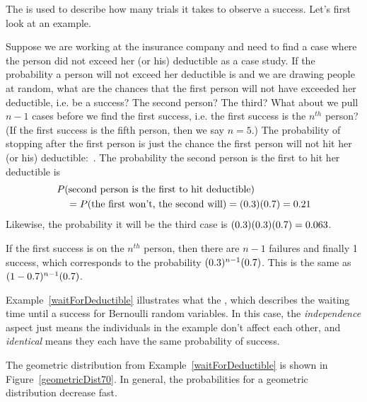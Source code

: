 The 
is used to describe how
many trials it takes to observe a success.
Let's first look at an example.

\begin{examplewrap}
\begin{nexample}{Suppose we are working at the insurance
    company and need to find a case where the person did
    not exceed her (or his) deductible as a case study.
    If the probability a person will not exceed her
    deductible is \insureSprob{} and we are drawing people
    at random, what are the chances that the first person
    will not have exceeded her deductible, i.e. be a success?
    The second person?
    The third?
    What about we pull $n - 1$ cases before we find
    the first success, i.e. the first success is the
    $n^{th}$ person?
    (If the first success is the fifth person, then we say $n=5$.)}
  \label{waitForDeductible}%
  The probability of stopping after the first person is just
  the chance the first person will not hit her (or his)
  deductible:~\insureSprob{}.
  The probability the second person is the first to hit
  her deductible is
  \begin{align*}
  &P(\text{second person is the first to hit deductible}) \\
  &\quad
    = P(\text{the first won't, the second will})
    = (0.3{})(0.7{})
    = 0.21{}
  \end{align*}
  Likewise, the probability it will be the third case is
  $(0.3{})(0.3{})(0.7{})
    = 0.063$.

  If the first success is on the $n^{th}$ person,
  then there are $n-1$ failures and finally 1 success,
  which corresponds to the probability
  $(0.3{})^{n-1}(0.7{})$.
  This is the same as
  $(1-0.7{})^{n-1}(0.7{})$.
\end{nexample}
\end{examplewrap}

Example~\ref{waitForDeductible} illustrates what the
,
which describes the waiting
time until a success for
Bernoulli random variables.
In this case, the \emph{independence} aspect just means
the individuals in the example don't affect each other,
and \emph{identical} means they each have the same probability
of success.

The geometric distribution from Example~\ref{waitForDeductible} is shown in Figure~\ref{geometricDist70}. In general, the probabilities for a geometric distribution decrease  fast.

